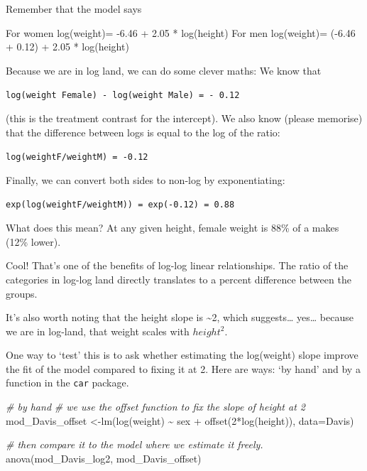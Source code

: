 \documentclass[
]{book}
\newenvironment{Shaded}{\begin{snugshade}}{\end{snugshade}}
\newcommand{\AttributeTok}[1]{\textcolor[rgb]{0.77,0.63,0.00}{#1}}
\newcommand{\CommentTok}[1]{\textcolor[rgb]{0.56,0.35,0.01}{\textit{#1}}}
\newcommand{\DecValTok}[1]{\textcolor[rgb]{0.00,0.00,0.81}{#1}}
\newcommand{\FunctionTok}[1]{\textcolor[rgb]{0.00,0.00,0.00}{#1}}
\newcommand{\NormalTok}[1]{#1}
\newcommand{\OtherTok}[1]{\textcolor[rgb]{0.56,0.35,0.01}{#1}}
\newcommand{\SpecialCharTok}[1]{\textcolor[rgb]{0.00,0.00,0.00}{#1}}
\begin{document}
Remember that the model says

For women log(weight)= -6.46 + 2.05 * log(height)
For men log(weight)= (-6.46 + 0.12) + 2.05 * log(height)

Because we are in log land, we can do some clever maths: We know that

\texttt{log(weight\ Female)\ -\ log(weight\ Male)\ =\ -\ 0.12}

(this is the treatment contrast for the intercept). We also know (please memorise) that the difference between logs is equal to the log of the ratio:

\texttt{log(weightF/weightM)\ =\ -0.12}

Finally, we can convert both sides to non-log by exponentiating:

\texttt{exp(log(weightF/weightM))\ =\ exp(-0.12)\ =\ 0.88}

What does this mean? At any given height, female weight is 88\% of a makes (12\% lower).

Cool! That's one of the benefits of log-log linear relationships. The ratio of the categories in log-log land directly translates to a percent difference between the groups.

It's also worth noting that the height slope is \textasciitilde2, which suggests\ldots{} yes\ldots{} because we are in log-land, that weight scales with \(height^2\).

One way to `test' this is to ask whether estimating the log(weight) slope improve the fit of the model compared to fixing it at 2. Here are ways: `by hand' and by a function in the \texttt{car} package.

\begin{Shaded}
\begin{Highlighting}[]
\CommentTok{\# by hand}
\CommentTok{\# we use the offset function to fix the slope of height at 2}
\NormalTok{mod\_Davis\_offset }\OtherTok{\textless{}{-}}\FunctionTok{lm}\NormalTok{(}\FunctionTok{log}\NormalTok{(weight) }\SpecialCharTok{\textasciitilde{}}\NormalTok{  sex }\SpecialCharTok{+} \FunctionTok{offset}\NormalTok{(}\DecValTok{2}\SpecialCharTok{*}\FunctionTok{log}\NormalTok{(height)), }\AttributeTok{data=}\NormalTok{Davis)}

\CommentTok{\# then compare it to the model where we estimate it freely.}
\FunctionTok{anova}\NormalTok{(mod\_Davis\_log2, mod\_Davis\_offset)}
\end{Highlighting}
\end{Shaded}
\end{document}
